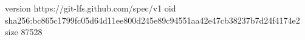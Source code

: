 version https://git-lfs.github.com/spec/v1
oid sha256:bc865c1799fc05d64d11ee800d245e89c94551aa42e47cb38237b7d24f4174e2
size 87528
